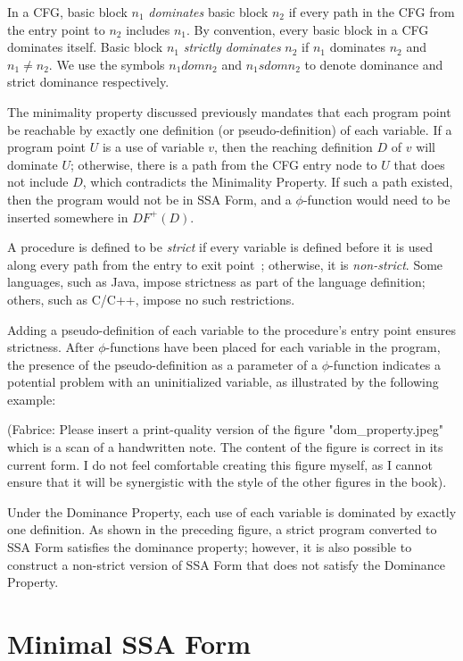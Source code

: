 In a CFG, basic block $n_{1}$ \emph{dominates} basic block $n_{2}$
if every path in the CFG from the entry point to $n_{2}$ includes
$n_{1}$. By convention, every basic block in a CFG dominates itself. Basic 
block $n_{1}$ \emph{strictly dominates} $n_{2}$ if $n_{1}$ dominates
$n_{2}$ and $n_{1} \neq n_{2}$. We use the symbols $n_{1} dom n_{2}$
and $n_{1} sdom n_{2}$ to denote dominance and strict dominance 
respectively.

The minimality property discussed previously mandates that each
program point be reachable by exactly one definition (or pseudo-definition)
of each variable. If a program point $U$ is a use of variable $v$, then the
reaching definition $D$ of $v$ will dominate $U$; otherwise, there is a path
from the CFG entry node to $U$ that does not include $D$, which contradicts
the Minimality Property. If such a  path existed, then the program would not
be in SSA Form, and a $\phi$-function would need to be inserted somewhere
in $DF^{+}(D)$.  

A procedure is defined to be \emph{strict} if every variable
is defined before it is used along every path from the entry
to exit point~\cite{BudimlicJun02}; otherwise, it is \emph{non-strict}. 
Some languages, such as Java, impose strictness as part of the language
definition; others, such as C/C++, impose no such restrictions. 
 
Adding a pseudo-definition of each variable to the procedure's entry
point ensures strictness. After $\phi$-functions have been placed
for each variable in the program, the presence of the pseudo-definition
as a parameter of a $\phi$-function indicates a potential problem with
an uninitialized variable, as illustrated by the following example:

(Fabrice: Please insert a print-quality version of the figure
"dom\_property.jpeg" which is a scan of a handwritten note. The
content of the figure is correct in its current form. I do not feel
comfortable creating this figure myself, as I cannot ensure that
it will be synergistic with the style of the other figures in the book).  
 
Under the Dominance Property, each use of each variable is dominated
by exactly one definition. As shown in the preceding figure, a strict
program converted to SSA Form satisfies the dominance property;
however, it is also possible to construct a non-strict version of SSA
Form that does not satisfy the Dominance Property.  

\section{Minimal SSA Form}
\label{sec:properties_and_flavors:minimalSSA}

